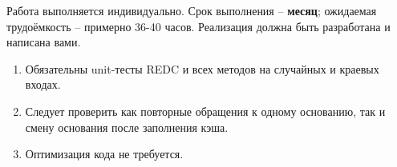 \documentclass{ca-capstone}
\begin{document}
\schedule
Работа выполняется индивидуально. Срок выполнения -- \textbf{месяц}; ожидаемая трудоёмкость
-- примерно 36-40 часов. Реализация должна быть разработана и написана вами.

\remarks
\begin{enumerate}
  \item Обязательны unit-тесты REDC и всех методов на случайных и краевых входах.
  \item Следует проверить как повторные обращения к одному основанию, так и смену основания
    после заполнения кэша.
  \item Оптимизация кода не требуется.
\end{enumerate}

\end{document}
